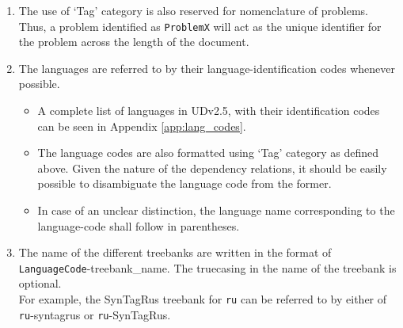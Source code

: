 \begin{enumerate}
    \item The use of `Tag' category is also reserved for nomenclature of problems. Thus, a problem identified as \verb|ProblemX| will act as the unique identifier for the problem across the length of the document.
    
    \item The languages are referred to by their language-identification codes whenever possible.
    \begin{itemize}
        \item A complete list of languages in UDv2.5, with their identification codes can be seen in Appendix \ref{app:lang_codes}.
        \item The language codes are also formatted using `Tag' category as defined above. Given the nature of the dependency relations, it should be easily possible to disambiguate the language code from the former.
        \item In case of an unclear distinction, the language name corresponding to the language-code shall follow in parentheses. 
    \end{itemize}
    
    \item The name of the different treebanks are written in the format of\\ \verb|LanguageCode|-treebank\_name. The truecasing in the name of the treebank is optional.\\
    For example, the SynTagRus treebank for \verb|ru| can be referred to by either of \verb|ru|-syntagrus or \verb|ru|-SynTagRus.
    

\end{enumerate}
